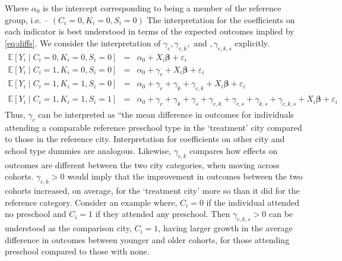 \documentclass[10pt]{article}
\begin{document}
Where $\alpha_0$ is the intercept corresponding to being a member of the reference group, i.e. -- $(C_i = 0, K_i = 0, S_i = 0)$   The interpretation for the coefficients on each indicator is best understood in terms of the expected outcomes implied by \ref{eq:diffs}. We consider the interpretation of $\gamma_c, \gamma_{c,k}, \text{ and }, \gamma_{c,k,s}$ explicitly. 
\begin{eqnarray*}  
    \mathbb{E}[Y_i \mid C_i = 0, K_i = 0, S_i = 0] & = & \alpha_0 + X_i \boldsymbol{\beta} + \varepsilon_i \\
    \mathbb{E}[Y_i \mid C_i = 1, K_i = 0, S_i = 0] & = & \alpha_0 +  \gamma_c + X_i \boldsymbol{\beta} + \varepsilon_i \\
    \mathbb{E}[Y_i \mid C_i = 1, K_i = 1, S_i = 0] & = & \alpha_0 + \gamma_c + \gamma_k + \gamma_{c,k} + X_i \boldsymbol{\beta} + \varepsilon_i \\
    \mathbb{E}[Y_i \mid C_i = 1, K_i = 1, S_i = 1] & = & \alpha_0 + \gamma_c + \gamma_k + \gamma_s + \gamma_{c,k} + \gamma_{c,s} + \gamma_{k,s} + \gamma_{c,k,s} + X_i \boldsymbol{\beta} + \varepsilon_i
\end{eqnarray*}
Thus, $\gamma_c$ can be interpreted as ``the mean difference in outcomes for individuals attending a comparable reference preschool type in the `treatment' city compared to those in the reference city.  Interpretation for coefficients on other city and school type dummies are analogous. Likewise, $\gamma_{c,k}$ compares how effects on outcomes are different between the two city categories, when moving across cohorts. $\gamma_{c,k} > 0$ would imply that the improvement in outcomes between the two cohorts increased, on average, for the `treatment city' more so than it did for the reference category. Consider an example where, $C_i = 0$ if the individual attended no preschool and  $C_i = 1$ if they attended any preschool. Then $\gamma_{c,k,s} > 0$ can be understood as the comparison city, $C_i = 1$, having larger growth in the average difference in outcomes between younger and older cohorts, for those attending preschool compared to those with none.
\end{document}
